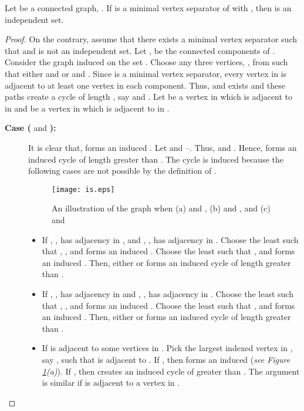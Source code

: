 \documentclass[runningheads]{llncs}
\begin{document}
\begin{lemma}
\label{mvsindependent}
Let  be a connected  graph, . If  is a minimal vertex separator of  with , then  is an independent set.
\end{lemma}
\begin{proof}
On the contrary, assume that there exists a minimal vertex separator  such that  and  is not an independent set. Let ,  be the connected components of . Consider the graph  induced on the set . Choose any three vertices, , from  such that either  and  or  and . Since  is a minimal vertex separator, every vertex in  is adjacent to at least one vertex in each component. Thus,  and  exists and these paths create a cycle of length , say  and . Let  be a vertex in  which is adjacent to  in  and  be a vertex in  which is adjacent to  in .
\begin{description}

\item[\textbf{Case (} and \textbf{):}] 
 It is clear that,  forms an induced . Let  and --. Thus,  and . Hence,  forms an induced cycle of length greater than . The cycle is induced because the following cases are not possible by the definition of .

\begin{figure}[h]
\centering
\texttt{[image: is.eps]}
\caption{An illustration of the graph when (a)  and , (b)  and , and (c)  and  }
\label{fig:is1}
\end{figure}


\begin{itemize}
\item[]  If , , has adjacency in , and , , has adjacency in . Choose the least  such that , , and  forms an induced . Choose the least  such that ,  and   forms an induced . Then, either  or   forms an induced cycle of length greater than . 

\item[]  If , , has adjacency in  and , , has adjacency in . Choose the least  such that , , and  forms an induced . Choose the least  such that ,  and   forms an induced . Then, either  or   forms an induced cycle of length greater than . 

\item[] If  is adjacent to some vertices in . Pick the largest indexed vertex in , say , such that  is adjacent to . If , then  forms an induced  (\emph{see Figure  \ref{fig:is1}(a)}). If , then  creates an induced cycle of greater than . The argument is similar if  is adjacent to a vertex in .


\end{itemize}
\end{description}
\end{proof}
\end{document}
